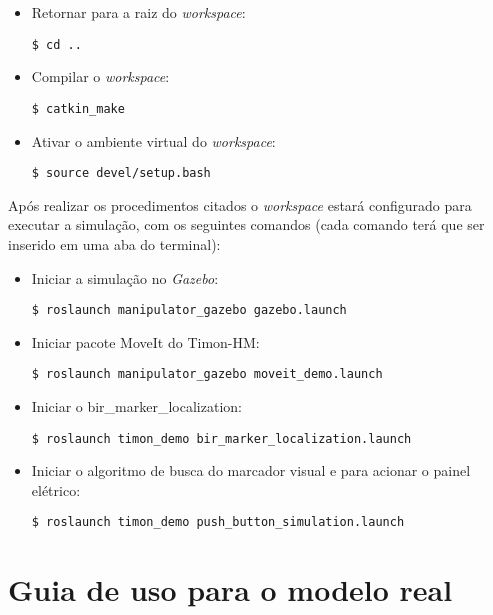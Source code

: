 \begin{itemize}
  \item Retornar para a raiz do \textit{workspace}:
  \begin{lstlisting}[frame=single]
    $ cd ..
  \end{lstlisting}
 
  \item Compilar o \textit{workspace}:
  \begin{lstlisting}[frame=single]
    $ catkin_make
  \end{lstlisting}
  \item Ativar o ambiente virtual do \textit{workspace}:
  \begin{lstlisting}[frame=single]
    $ source devel/setup.bash
  \end{lstlisting}
\end{itemize}

Após realizar os procedimentos citados o \textit{workspace} estará configurado para executar a simulação, com os seguintes comandos (cada comando terá que ser inserido em uma aba do terminal):

\begin{itemize}
  \item Iniciar a simulação no \textit{Gazebo}:
  \begin{lstlisting}[frame=single]
    $ roslaunch manipulator_gazebo gazebo.launch
  \end{lstlisting}
  \item Iniciar pacote MoveIt do Timon-HM:
  \begin{lstlisting}[frame=single]
    $ roslaunch manipulator_gazebo moveit_demo.launch
  \end{lstlisting}
  \item Iniciar o bir\_marker\_localization:
  \begin{lstlisting}[frame=single]
   $ roslaunch timon_demo bir_marker_localization.launch
  \end{lstlisting}
  \item Iniciar o algoritmo de busca do marcador visual e para acionar o painel elétrico:
  \begin{lstlisting}[frame=single]
    $ roslaunch timon_demo push_button_simulation.launch
  \end{lstlisting}  
\end{itemize}




\section{Guia de uso para o modelo real}
\label{sec:guia_real}

